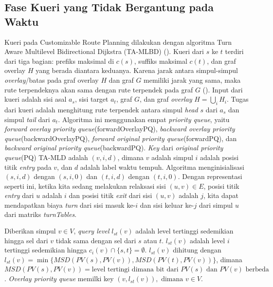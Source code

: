 \subsection{Fase Kueri yang Tidak Bergantung pada Waktu}
\label{subsec:tdcrp-kueri}
Kueri pada Customizable Route Planning dilakukan dengan algoritma Turn Aware Multilevel Bidirectional Dijkstra (TA-MLBD) (\cite{Delling2015}). Kueri dari $s$ ke $t$ terdiri dari tiga bagian: prefiks maksimal di $c(s)$, suffiks maksimal $c(t)$, dan graf overlay $H$ yang berada diantara keduanya. Karena jarak antara simpul-simpul \textit{overlay}/batas pada graf overlay $H$ dan graf $G$ memiliki jarak yang sama, maka rute terpendeknya akan sama dengan rute terpendek pada graf $G$ (\cite{Delling2015}). Input dari kueri adalah sisi asal $a_s$, sisi target $a_t$, graf $G$, dan graf \textit{overlay} $H =\displaystyle\bigcup_{i} H_i$. Tugas dari kueri adalah menghitung rute terpendek antara simpul \textit{head} $s$ dari $a_s$ dan simpul \textit{tail} dari $a_t$. Algoritma ini menggunakan empat \textit{priority queue}, yaitu \textit{forward overlay priority queue}(forwardOverlayPQ), \textit{backward overlay priority queue}(backwardOverlayPQ), \textit{forward original priority queue}(forwardPQ), dan \textit{backward original priority queue}(backwardPQ). \textit{Key} dari \textit{original priority queue}(PQ) TA-MLD adalah $(v,i,d)$, dimana $v$ adalah simpul $i$ adalah posisi titik \textit{entry} pada $v$, dan $d$ adalah label waktu tempuh. Algoritma menginisialisasi $(s,i,d)$ dengan $(s,i,0)$ dan $(t,i,d)$ dengan $(t,i,0)$. Dengan representasi seperti ini, ketika kita sedang melakukan relaksasi sisi $(u,v)\in E$, posisi titik \textit{entry} dari $u$ adalah $i$ dan posisi titik \textit{exit} dari sisi $(u,v)$ adalah $j$, kita dapat mendapatkan biaya \textit{turn} dari sisi masuk ke-$i$ dan sisi keluar ke-$j$ dari simpul $u$ dari matriks \textit{turnTables}.

Diberikan simpul $v\in V$, \textit{query level} $l_{st}(v)$ adalah level tertinggi sedemikian hingga sel dari $v$ tidak sama dengan sel dari $s$ atau $t$. $l_{st}(v)$ adalah level $i$ tertinggi sedemikian hingga $c_i(v)\cap\{s,t\}=\emptyset$. $l_{st}(v)$ dihitung dengan $l_{st}(v)=\min\{MSD(PV(s), PV(v)), MSD(PV(t), PV(v))\}$, dimana $MSD(PV(s), PV(v))=\text{level tertingi dimana bit dari } PV(s) \text{ dan }PV(v) \text{ berbeda}$. \textit{Overlay priority queue} memilki key $(v, l_{st}(v)),\text{ dimana } v\in V$.

